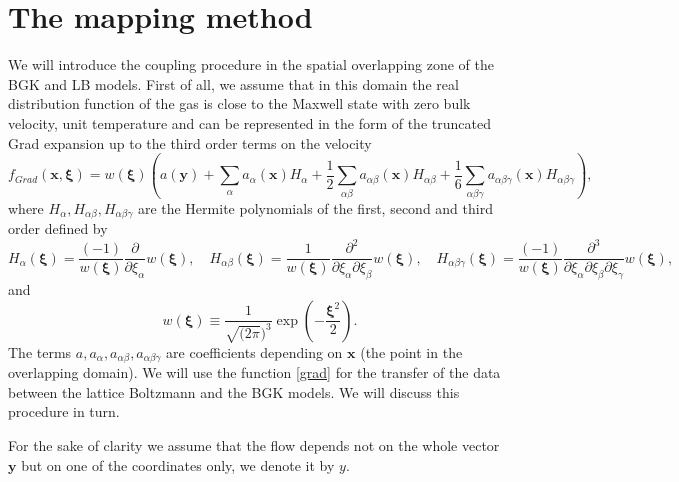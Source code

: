 \documentclass[]{elsarticle} %
\begin{document}
{\section{The  mapping  method}

We will introduce the coupling  procedure  in the spatial overlapping  zone  of the BGK and LB models.
First of all, we  assume that in this  domain  the real distribution function of the gas is close  to the Maxwell state with zero bulk velocity,  unit temperature and  can  be represented in the  form of the truncated  Grad expansion up to the third order terms on the velocity
\begin{equation}\label{grad}
f_{Grad}(\mathbf{x},\boldsymbol{\xi})=w(\boldsymbol{\xi})\left(a(\mathbf{y})
+\sum_{\alpha}a_{\alpha}(\mathbf{x})H_{\alpha}+\frac{1}{2}\sum_{\alpha\beta}a_{\alpha \beta}(\mathbf{x})H_{\alpha\beta}+\frac{1}{6}\sum_{\alpha\beta \gamma}a_{\alpha\beta \gamma}(\mathbf{x})H_{\alpha\beta \gamma}\right),
\end{equation}
 where $H_{\alpha}, H_{\alpha\beta}, H_{\alpha\beta \gamma}$ are the  Hermite polynomials of the first, second and third order defined by
  $$
H_\alpha(\boldsymbol{\xi})=\frac{(-1)}{w(\boldsymbol{\xi})}\frac{\partial}{\partial \xi_\alpha}w(\boldsymbol{\xi}),  \quad H_{\alpha\beta}(\boldsymbol{\xi})=\frac{1}{w(\boldsymbol{\xi})}\frac{\partial^2}{\partial \xi_\alpha\partial \xi_\beta}w(\boldsymbol{\xi}),
\quad H_{\alpha\beta \gamma}(\boldsymbol{\xi})=\frac{(-1)}{w(\boldsymbol{\xi})}\frac{\partial^3}{\partial \xi_\alpha\partial \xi_\beta \partial \xi_\gamma}w(\boldsymbol{\xi}),
$$
and
 $$
 w(\boldsymbol{\xi})\equiv \frac{1}{\sqrt{(2\pi})^3}\exp\left(-\frac{\boldsymbol{\xi}^2}{2}\right).
 $$
 The  terms $a, a_{\alpha},a_{\alpha\beta}, a_{\alpha\beta \gamma}$ are coefficients depending on $\mathbf{x}$ (the point in the overlapping domain).
 We will use the function \eqref{grad} for the transfer of the  data between the lattice Boltzmann  and the BGK models. We will discuss this  procedure  in turn.

For the sake of clarity we  assume  that the flow  depends  not on the whole vector $\mathbf{y}$ but on one of the coordinates only, we denote  it  by $y$.

}
\end{document}
